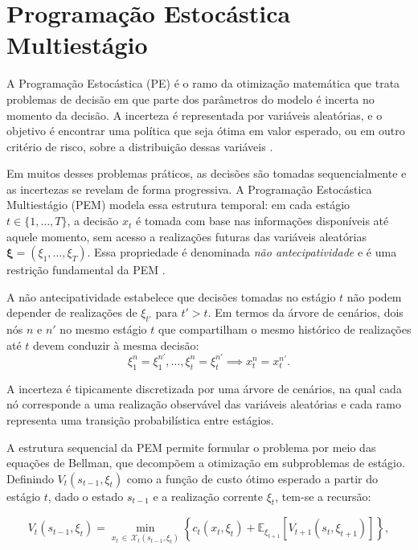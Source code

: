 \section{Programação Estocástica Multiestágio}
\label{sec:prog_estocastica}

A Programação Estocástica (PE) é o ramo da otimização matemática que trata problemas de decisão em que parte dos parâmetros do modelo é incerta no momento da decisão. A incerteza é representada por variáveis aleatórias, e o objetivo é encontrar uma política que seja ótima em valor esperado, ou em outro critério de risco, sobre a distribuição dessas variáveis \cite{birge2011}.

Em muitos desses problemas práticos, as decisões são tomadas sequencialmente e as incertezas se revelam de forma progressiva. A Programação Estocástica Multiestágio (PEM) modela essa estrutura temporal: em cada estágio $t \in \{1,\ldots,T\}$, a decisão $x_t$ é tomada com base nas informações disponíveis até aquele momento, sem acesso a realizações futuras das variáveis aleatórias $\boldsymbol{\xi} = (\xi_1, \ldots, \xi_T)$. Essa propriedade é denominada \emph{não antecipatividade} e é uma restrição fundamental da PEM \cite{shapiro2009}.

A não antecipatividade estabelece que decisões tomadas no estágio $t$ não podem depender de realizações de $\xi_{t'}$ para $t' > t$. Em termos da árvore de cenários, dois nós $n$ e $n'$ no mesmo estágio $t$ que compartilham o mesmo histórico de realizações até $t$ devem conduzir à mesma decisão:
\begin{equation}
  \xi_1^n = \xi_1^{n'}, \ldots, \xi_t^n = \xi_t^{n'} \implies x_t^n = x_t^{n'}.
  \label{eq:nao_antecipatividade}
\end{equation}

A incerteza é tipicamente discretizada por uma árvore de cenários, na qual cada nó corresponde a uma realização observável das variáveis aleatórias e cada ramo representa uma transição probabilística entre estágios.

A estrutura sequencial da PEM permite formular o problema por meio das equações de Bellman, que decompõem a otimização em subproblemas de estágio. Definindo $V_t(s_{t-1}, \xi_t)$ como a função de custo ótimo esperado a partir do estágio $t$, dado o estado $s_{t-1}$ e a realização corrente $\xi_t$, tem-se a recursão:

\begin{equation}
  V_t(s_{t-1}, \xi_t) = \min_{x_t \,\in\, \mathcal{X}_t(s_{t-1}, \xi_t)} \left\{ c_t(x_t, \xi_t) + \mathbb{E}_{\xi_{t+1}}\!\left[V_{t+1}(s_t, \xi_{t+1})\right] \right\},
  \label{eq:bellman}
\end{equation}

